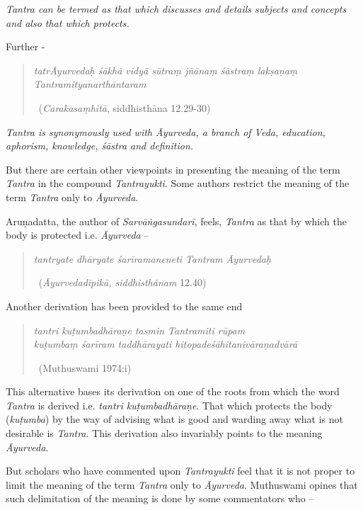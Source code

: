 \textit{Tantra can be termed as that which discusses and details subjects and concepts and also that which protects.}

Further -

\begin{verse}
\textit{tatrĀyurvedaḥ śākhā vidyā sūtraṃ jñānaṃ śāstraṃ lakṣaṇaṃ Tantramityanarthāntaram}

~\hfill (\textit{Carakasaṃhitā}, siddhisthāna 12.29-30)
\end{verse}

\textit{Tantra is synonymously used with Āyurveda, a branch of Veda, education, aphorism, knowledge, śāstra and definition.}

But there are certain other viewpoints in presenting the meaning of the term \textit{Tantra} in the compound \textit{Tantrayukti}. Some authors restrict the meaning of the term \textit{Tantra} only to \textit{Āyurveda}.

Aruṇadatta, the author of \textit{Sarvāṅgasundarī}, feels, \textit{Tantra} as that by which the body is protected i.e. \textit{Āyurveda} –

\begin{verse}
\textit{tantryate dhāryate śarīramaneneti Tantram Āyurvedaḥ}

~\hfill (\textit{Āyurvedadīpikā, siddhisthānam} 12.40)
\end{verse}

Another derivation has been provided to the same end

\begin{verse}
\textit{tantri kuṭumbadhāraṇe tasmin Tantramiti rūpam}\\\textit{kuṭumbaṃ śarīram taddhārayati hitopadeśāhitanivāraṇadvārā}

~\hfill (Muthuswami 1974:i)
\end{verse}

This alternative bases its derivation on one of the roots from which the word \textit{Tantra} is derived i.e. \textit{tantri kuṭumbadhāraṇe}. That which protects the body (\textit{kuṭumba}) by the way of advising what is good and warding away what is not desirable is \textit{Tantra}. This derivation also invariably points to the meaning \textit{Āyurveda}.

But scholars who have commented upon \textit{Tantrayukti} feel that it is not proper to limit the meaning of the term \textit{Tantra} only to \textit{Āyurveda}. Muthuswami opines that such delimitation of the meaning is done by some commentators who –

